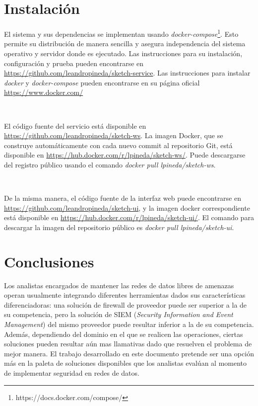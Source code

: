 \documentclass[a4paper,12pt, oneside]{article}
\begin{document}
\section{Instalación}
El sistema y sus dependencias se implementan usando \textit{docker-compose}\footnote{https://docs.docker.com/compose/}. Esto permite su distribución de manera sencilla y asegura independencia del sistema operativo y servidor donde es ejecutado. Las instrucciones para su instalación, configuración y prueba pueden encontrarse en \hyperref[https://github.com/leandropineda/sketch-service]{https://github.com/leandropineda/sketch-service}. Las instrucciones para instalar \textit{docker} y \textit{docker-compose} pueden encontrarse en su página oficial \hyperref[https://www.docker.com/]{https://www.docker.com/}

\

El código fuente del servicio está disponible en \hyperref[https://github.com/leandropineda/sketch-ws]{https://github.com/leandropineda/sketch-ws}. La imagen Docker, que se construye automáticamente con cada nuevo commit al repositorio Git, está disponible en \hyperref[https://hub.docker.com/r/lpineda/sketch-ws/]{https://hub.docker.com/r/lpineda/sketch-ws/}. Puede descargarse del registro público usando el comando \textit{docker pull lpineda/sketch-ws}.

\

De la misma manera, el código fuente de la interfaz web puede encontrarse en \hyperref[https://github.com/leandropineda/sketch-ui]{https://github.com/leandropineda/sketch-ui}, y la imagen docker correspondiente está disponible en \hyperref[https://hub.docker.com/r/lpineda/sketch-ui/]{https://hub.docker.com/r/lpineda/sketch-ui/}. El comando para descargar la imagen del repositorio público es \textit{docker pull lpineda/sketch-ui}.


\clearpage
\section{Conclusiones}
Los analistas encargados de mantener las redes de datos libres de amenazas operan usualmente integrando diferentes herramientas dados sus características diferenciadoras: una solución de firewall de proveedor puede ser superior a la de su competencia, pero la solución de SIEM (\textit{Security Information and Event Management}) del mismo proveedor puede resultar inferior a la de su competencia. Además, dependiendo del dominio en el que se realicen las operaciones, ciertas soluciones pueden resultar aún mas llamativas dado que resuelven el problema de mejor manera. El trabajo desarrollado en este documento pretende ser una opción más en la paleta de soluciones disponibles que los analistas evalúan al momento de implementar seguridad en redes de datos.
\end{document}
